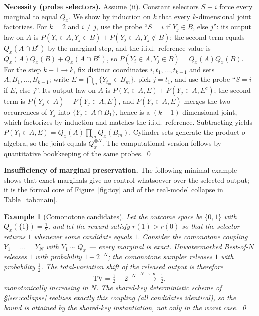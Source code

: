 \documentclass{article} %
\newtheorem{example}{Example}
\begin{document}
\textbf{Necessity (probe selectors).}
Assume (ii). Constant selectors $S\equiv i$ force every marginal to equal
$Q_x$. We show by induction on $k$ that every $k$-dimensional joint
factorizes. For $k=2$ and $i\ne j$, use the probe ``$S=i$ if $Y_j\in B$, else
$j$'': its output law on $A$ is
$P(Y_i\in A,Y_j\in B)+P(Y_j\in A,Y_j\notin B)$; the second term equals
$Q_x(A\cap B^c)$ by the marginal step, and the i.i.d.\ reference value is
$Q_x(A)Q_x(B)+Q_x(A\cap B^c)$, so $P(Y_i\in A,Y_j\in B)=Q_x(A)Q_x(B)$.
For the step $k{-}1\to k$, fix distinct coordinates $i,t_1,\dots,t_{k-1}$ and
sets $A,B_1,\dots,B_{k-1}$; write $E=\bigcap_m\{Y_{t_m}\in B_m\}$, pick
$j=t_1$, and use the probe ``$S=i$ if $E$, else $j$''. Its output law on $A$
is $P(Y_i\in A,E)+P(Y_j\in A,E^c)$; the second term is
$P(Y_j\in A)-P(Y_j\in A,E)$, and $P(Y_j\in A,E)$ merges the two occurrences
of $Y_j$ into $\{Y_j\in A\cap B_1\}$, hence is a $(k{-}1)$-dimensional joint,
which factorizes by induction and matches the i.i.d.\ reference. Subtracting
yields $P(Y_i\in A,E)=Q_x(A)\prod_m Q_x(B_m)$. Cylinder sets generate the
product $\sigma$-algebra, so the joint equals $Q_x^{\otimes N}$. The
computational version follows by quantitative bookkeeping of the same probes.
\qed

\textbf{Insufficiency of marginal preservation.}
The following minimal example shows that exact marginals give no control
whatsoever over the selected output; it is the formal core of
Figure~\ref{fig:toy} and of the real-model collapse in
Table~\ref{tab:main}.

\begin{example}[Comonotone candidates]\label{ex:comonotone}
Let the outcome space be $\{0,1\}$ with $Q_x(\{1\})=\tfrac12$, and let the reward
satisfy $r(1)>r(0)$ so that the selector returns $1$ whenever some candidate
equals $1$. Consider the comonotone coupling $Y_1=\dots=Y_N$ with
$Y_1\sim Q_x$ --- every marginal is exact. Unwatermarked Best-of-$N$ releases $1$
with probability $1-2^{-N}$; the comonotone sampler releases $1$ with probability
$\tfrac12$. The total-variation shift of the released output is therefore
\[
\mathrm{TV}=\tfrac12-2^{-N}\;\xrightarrow{N\to\infty}\;\tfrac12 ,
\]
monotonically increasing in $N$. The shared-key deterministic scheme of
\S\ref{sec:collapse} realizes exactly this coupling (all candidates identical),
so the bound is attained by the shared-key instantiation, not only in the worst case. \qed
\end{example}
\end{document}

